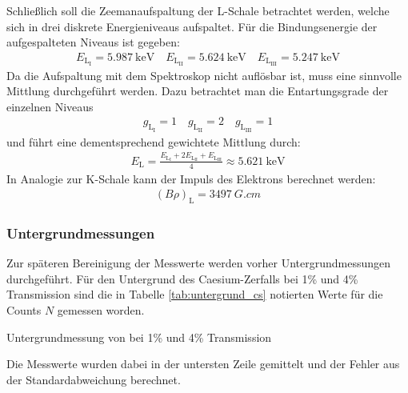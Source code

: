 \documentclass[11pt, a4paper]{article}
\numberwithin{equation}{section}
\begin{document}
Schließlich soll die Zeemanaufspaltung der L-Schale betrachtet werden, welche sich in drei diskrete Energieniveaus aufspaltet.
Für die Bindungsenergie der aufgespalteten Niveaus ist gegeben:
\begin{align*}
E_{\mathrm{L}_{\mathrm{I}}} = \SI{5,987}{\kilo\electronvolt} \quad
E_{\mathrm{L}_{\mathrm{II}}} = \SI{5,624}{\kilo\electronvolt} \quad
E_{\mathrm{L}_{\mathrm{III}}} = \SI{5,247}{\kilo\electronvolt}
\end{align*}
Da die Aufspaltung mit dem Spektroskop nicht auflösbar ist, muss eine sinnvolle Mittlung durchgeführt werden.
Dazu betrachtet man die Entartungsgrade der einzelnen Niveaus
\begin{align*}
g_{\mathrm{L}_{\mathrm{I}}} = \num{1} \quad
g_{\mathrm{L}_{\mathrm{II}}} = \num{2} \quad
g_{\mathrm{L}_{\mathrm{III}}} = \num{1}
\end{align*}
und führt eine dementsprechend gewichtete Mittlung durch:
\begin{align*}
E_\mathrm{L} = \frac{E_{\mathrm{L}_{\mathrm{I}}} + 2E_{\mathrm{L}_{\mathrm{II}}} + E_{\mathrm{L}_{\mathrm{III}}}}{4} \approx \SI{5,621}{\kilo\electronvolt}
\end{align*}
In Analogie zur K-Schale kann der Impuls des Elektrons berechnet werden:
\begin{align}
\left(B \rho \right)_\mathrm{L} = \SI{3497}{G.cm}
\end{align}

\subsubsection{Untergrundmessungen}

Zur späteren Bereinigung der Messwerte werden vorher Untergrundmessungen durchgeführt.
Für den Untergrund des Caesium-Zerfalls bei 1\% und 4\% Transmission sind die in Tabelle \ref{tab:untergrund_cs} notierten Werte für die Counts $N$ gemessen worden.
\begin{table}[h]
	\centering
	
	\caption{Untergrundmessung von  bei 1\% und 4\% Transmission}
	\label{tab:untergrund_cs}
\end{table}
Die Messwerte wurden dabei in der untersten Zeile gemittelt und der Fehler aus der Standardabweichung berechnet.
\end{document}

